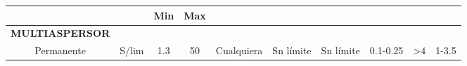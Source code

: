 \begin{table}[h!]
\begin{turn}{90}
\begin{tabular}{c|c|c|c|c|c|c|c|c|c}
			\multicolumn{1}{|c|}{}                                                           & \multicolumn{1}{c|}{}                                                                     & \multicolumn{1}{c|}{Min}                                                               & \multicolumn{1}{c|}{Max} & \multicolumn{1}{c|}{}                                                            & \multicolumn{1}{c|}{}                                                               & \multicolumn{1}{c|}{}                                                                  & \multicolumn{1}{c|}{}                                                              & \multicolumn{1}{c|}{}                                                             & \multicolumn{1}{c|}{}                                                                     \\ \midrule
			\multicolumn{1}{|c|}{\textbf{MULTIASPERSOR}}                                     & \multicolumn{1}{c|}{}                                                                     & \multicolumn{1}{c|}{}                                                                  & \multicolumn{1}{c|}{}    & \multicolumn{1}{c|}{}                                                            & \multicolumn{1}{c|}{}                                                               & \multicolumn{1}{c|}{}                                                                  & \multicolumn{1}{c|}{}                                                              & \multicolumn{1}{c|}{}                                                             & \multicolumn{1}{c|}{}                                                                     \\ \midrule
			\multicolumn{1}{|c|}{Permanente}                                                 & \multicolumn{1}{c|}{S/lim}                                                                & \multicolumn{1}{c|}{1.3}                                                               & \multicolumn{1}{c|}{50}  & \multicolumn{1}{c|}{Cualquiera}                                                  & \multicolumn{1}{c|}{Sn límite}                                                      & \multicolumn{1}{c|}{Sn límite}                                                         & \multicolumn{1}{c|}{0.1-0.25}                                                      & \multicolumn{1}{c|}{\textgreater{}4}                                              & \multicolumn{1}{c|}{1-3.5}                                                                \\ \midrule

\end{tabular}
\end{turn}
\end{table}
